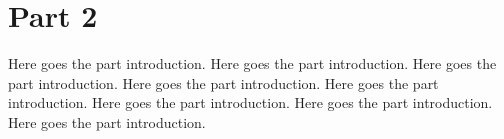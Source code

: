 \chapter{Part 2}

Here goes the part introduction.
Here goes the part introduction.
Here goes the part introduction.
Here goes the part introduction.
Here goes the part introduction.
Here goes the part introduction.
Here goes the part introduction.
Here goes the part introduction.



